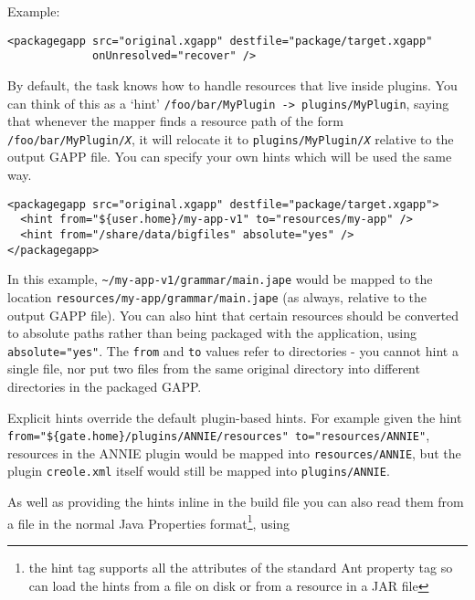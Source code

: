Example:
\begin{small}
\begin{verbatim}
<packagegapp src="original.xgapp" destfile="package/target.xgapp"
             onUnresolved="recover" />
\end{verbatim}
\end{small}


By default, the task knows how to handle resources that live inside plugins.
You can think of this as a `hint' \texttt{/foo/bar/MyPlugin ->
plugins/MyPlugin}, saying that whenever the mapper finds a resource path of
the form \texttt{/foo/bar/MyPlugin/\emph{X}}, it will relocate it to
\texttt{plugins/MyPlugin/\emph{X}} relative to the output GAPP file.  You can
specify your own hints which will be used the same way.

\begin{small}
\begin{verbatim}
<packagegapp src="original.xgapp" destfile="package/target.xgapp">
  <hint from="${user.home}/my-app-v1" to="resources/my-app" />
  <hint from="/share/data/bigfiles" absolute="yes" />
</packagegapp>
\end{verbatim}
\end{small}

In this example, \verb|~/my-app-v1/grammar/main.jape| would be mapped to the
location \verb|resources/my-app/grammar/main.jape| (as always, relative to the
output GAPP file).  You can also hint that certain resources should be
converted to absolute paths rather than being packaged with the application,
using \verb|absolute="yes"|.  The \texttt{from} and \texttt{to} values refer to
directories - you cannot hint a single file, nor put two files from the same
original directory into different directories in the packaged GAPP.

Explicit hints override the default plugin-based hints.  For example given the
hint \verb|from="${gate.home}/plugins/ANNIE/resources" to="resources/ANNIE"|,
resources in the ANNIE plugin would be mapped into
\texttt{resources/ANNIE}, but the plugin \texttt{creole.xml} itself would still
be mapped into \texttt{plugins/ANNIE}.

As well as providing the hints inline in the build file you can also read them
from a file in the normal Java Properties format\footnote{the hint tag supports
all the attributes of the standard Ant property tag so can load the hints from
a file on disk or from a resource in a JAR file}, using

